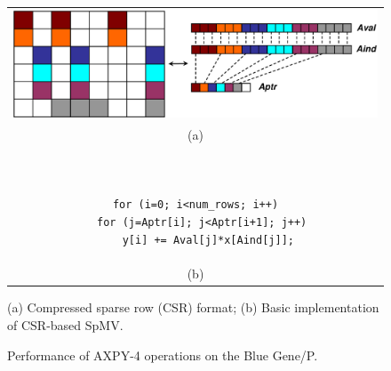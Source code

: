 \begin{figure}%
\begin{tabular}{c}
\begin{minipage}[t]{.47\textwidth}
\centering
\vspace{0.2in}
\includegraphics[width=1.0\textwidth]{figures/spmv.eps}  
\end{minipage}
\\
(a)
\\
\begin{minipage}[t]{.3\textwidth}
\scriptsize
\begin{verbatim}


for (i=0; i<num_rows; i++)
  for (j=Aptr[i]; j<Aptr[i+1]; j++)
    y[i] += Aval[j]*x[Aind[j]];

\end{verbatim}
\end{minipage}
\\
(b)
\\
\end{tabular}

\caption{(a) Compressed sparse row (CSR) format; (b) Basic implementation of CSR-based SpMV.}
\label{fig:spmv}
\end{figure}


\begin{figure}%
\begin{center} 
\end{center}
\caption{Performance of AXPY-4 operations on the Blue Gene/P.} 
\label{fig:axpy4-bgp-results} 
\end{figure} 




